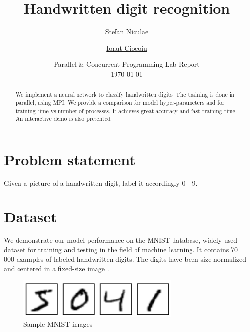 \documentclass[a4paper]{article}
\begin{document}
	\title{
	\Huge Handwritten digit recognition
	}
	
	\vspace{2cm}
	
	\author{\Large \href{mailto:stefan.niculae@my.fmi.unibuc.ro}{Stefan Niculae} \and \Large \href{mailto:ionut.ciocoiu@my.fmi.unibuc.ro}{Ionut Ciocoiu}
	\vspace{3cm}}
	
	\date{
	\large Parallel \& Concurrent Programming Lab Report \\
    \vspace{0.2cm}
	\today
	}

	\maketitle
	\setlength{\parindent}{0pt}

\vspace{5cm}
\begin{abstract}
We implement a neural network to classify handwritten digits. The training is done in parallel, using MPI. We provide a comparison for model hyper-parameters and for training time vs number of processes. It achieves great accuracy and fast training time. An interactive demo is also presented



\end{abstract}
	\newpage
	\tableofcontents
	\newpage


\section{Problem statement}
\label{sec:problem}
Given a picture of a handwritten digit, label it accordingly 0 - 9.

\section{Dataset}
\label{sec:dataset}
We demonstrate our model performance on the MNIST database, widely used dataset for training and testing in the field of machine learning. It contains 70 000 examples of labeled handwritten digits. The digits have been size-normalized and centered in a fixed-size image \cite{mnist}. 

\begin{figure}[htb]
\centering
\includegraphics[width=8cm]{images/mnist-images.png}
\caption{Sample MNIST images}
\end{figure}
\end{document}
